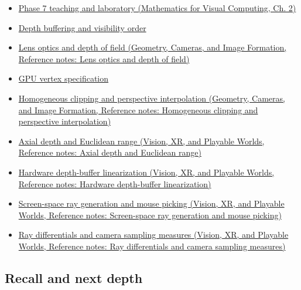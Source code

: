 \hypertarget{appendix-1c07d64f5e70-used-by}{}

\begin{itemize}
\item
  \href{../02-Mathematics-for-Visual-Computing/main.pdf\#nameddest=01-foundations-i-ch018-keep-the-promises-visible-while-moving-between-representations}{Phase 7 teaching and laboratory (Mathematics for Visual Computing, Ch. 2)}
\item
  \hyperref[appendix-97578ed97952]{Depth buffering and visibility order}
\item
  \href{../03-Geometry-Cameras-and-Image-Formation/main.pdf\#nameddest=appendix-21f8456e2629}{Lens optics and depth of field (Geometry, Cameras, and Image Formation, Reference notes: Lens optics and depth of field)}
\item
  \hyperref[appendix-749ba51a6c25]{GPU vertex specification}
\item
  \href{../03-Geometry-Cameras-and-Image-Formation/main.pdf\#nameddest=appendix-40426e4b2103}{Homogeneous clipping and perspective interpolation (Geometry, Cameras, and Image Formation, Reference notes: Homogeneous clipping and perspective interpolation)}
\item
  \href{../07-Vision-XR-and-Playable-Worlds/main.pdf\#nameddest=appendix-cac01ebeeb11}{Axial depth and Euclidean range (Vision, XR, and Playable Worlds, Reference notes: Axial depth and Euclidean range)}
\item
  \href{../07-Vision-XR-and-Playable-Worlds/main.pdf\#nameddest=appendix-1bc40b08db4a}{Hardware depth-buffer linearization (Vision, XR, and Playable Worlds, Reference notes: Hardware depth-buffer linearization)}
\item
  \href{../07-Vision-XR-and-Playable-Worlds/main.pdf\#nameddest=appendix-f1a6d43e80d1}{Screen-space ray generation and mouse picking (Vision, XR, and Playable Worlds, Reference notes: Screen-space ray generation and mouse picking)}
\item
  \href{../07-Vision-XR-and-Playable-Worlds/main.pdf\#nameddest=appendix-8c40fad29462}{Ray differentials and camera sampling measures (Vision, XR, and Playable Worlds, Reference notes: Ray differentials and camera sampling measures)}
\end{itemize}

\subsection{Recall and next depth}\label{appendix-1c07d64f5e70-recall-and-next-depth}

